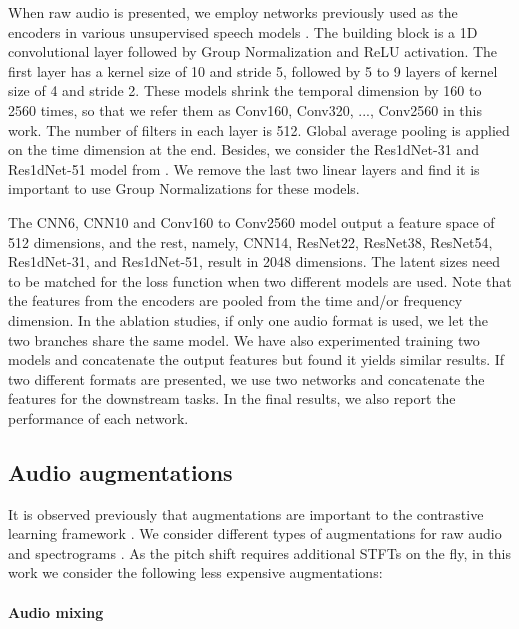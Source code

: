 \documentclass{article}
\begin{document}
When raw audio is presented, we employ networks previously used as the encoders in various unsupervised speech models \cite{schneider2019wav2vec, kawakami2020learning, baevski2020wav2vec}. The building block is a 1D convolutional layer followed by Group Normalization and ReLU activation. The first layer has a kernel size of 10 and stride 5, followed by 5 to 9 layers of kernel size of 4 and stride 2. These models shrink the temporal dimension by 160 to 2560 times, so that we refer them as Conv160, Conv320, ..., Conv2560 in this work. The number of filters in each layer is 512. Global average pooling is applied on the time dimension at the end. Besides, we consider the Res1dNet-31 and Res1dNet-51 model from \cite{kong2020panns}. We remove the last two linear layers and find it is important to use Group Normalizations for these models.

The CNN6, CNN10 and Conv160 to Conv2560 model output a feature space of 512 dimensions, and the rest, namely, CNN14, ResNet22, ResNet38, ResNet54, Res1dNet-31, and Res1dNet-51, result in 2048 dimensions. The latent sizes need to be matched for the loss function when two different models are used. Note that the features from the encoders are pooled from the time and/or frequency dimension. In the ablation studies, if only one audio format is used, we let the two branches share the same model. We have also experimented training two models and concatenate the output features but found it yields similar results. If two different formats are presented, we use two networks and concatenate the features for the downstream tasks. In the final results, we also report the performance of each network.


\subsection{Audio augmentations}

It is observed previously that augmentations are important to the contrastive learning framework \cite{bachman2019learning, henaff2020data, chen2020simple}. We consider different types of augmentations for raw audio and spectrograms \cite{jansen2018unsupervised, park2019specaugment, kharitonov2020data}. As the pitch shift requires additional STFTs on the fly, in this work we consider the following less expensive augmentations:

\paragraph{Audio mixing}
\end{document}
